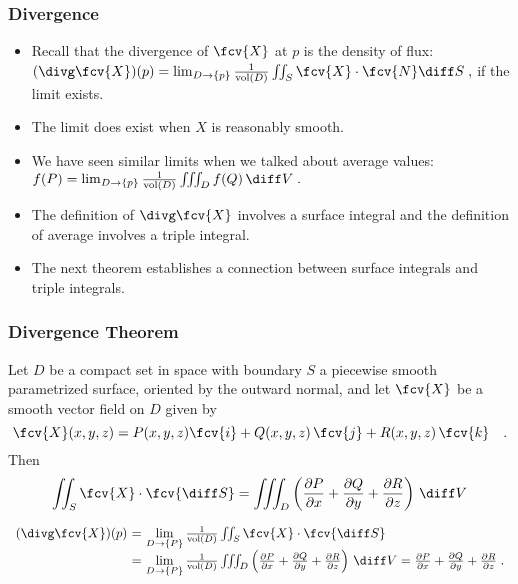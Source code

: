 \begin{frame}
\frametitle{Divergence}
\begin{itemize}
\item Recall that the divergence of $\fcv{X}$ at $p$ is the density of flux:
$(\divg \fcv{X})(p) = \lim_{D\to \{p\}} \frac{1}{\text{vol}(D)} \iint_S \fcv{X} \cdot \fcv{N}\diff S \; ,$
if the limit exists. 
\item<2->  The limit does exist when $X$ is reasonably smooth.
\item<3-> We have seen similar limits when we talked about average values:
$f(P) = \lim_{D\to\{p\}} \frac{1}{\text{vol}(D)} \iiint_D f(Q)\, \diff V\; .$
\item<4-> The definition of $\divg \fcv{X}$ involves a surface integral and the definition of average involves a triple integral.
\item<5-> The next theorem establishes a connection between surface integrals and triple integrals.
\end{itemize}
\end{frame}

\begin{frame}
  \frametitle{Divergence Theorem}

\begin{theorem}
Let $D$ be a compact set in space with boundary $S$ a piecewise smooth parametrized surface, oriented by the outward normal, and let $\fcv{X}$ be a smooth vector field on $D$ given by
\[\fcv{X}(x,y,z)= P (x,y,z) \fcv{i} + Q(x,y,z) \, \fcv{j} + R(x,y,z)\, \fcv{k}\quad .
\]
Then
\[
\iint_S \fcv{X} \cdot \fcv{\diff S} = \iiint_D \left(\frac{\partial P}{\partial x}+ \frac{\partial Q}{\partial y} + \frac{\partial R}{\partial z} \right) \, \diff V
\]
\end{theorem}
\begin{corollary}
$
\begin{array}{r@{~}c@{~}l}
  (\divg \fcv{X}) (p) &= &
\lim\limits_{D\to \{P\}} \frac{1}{\text{vol}(D)}\iint_S \fcv{X} \cdot \fcv{\diff S}   \\
&= & \lim\limits_{D\to \{P\}} \frac{1}{\text{vol}(D)}\iiint_D \left(\frac{\partial P}{\partial x}+ \frac{\partial Q}{\partial y} + \frac{\partial R}{\partial z} \right) \, \diff V =
  \frac{\partial P}{\partial x}+ \frac{\partial Q}{\partial y} + \frac{\partial R}{\partial z}\; .
\end{array}
$
\end{corollary}
\end{frame}

